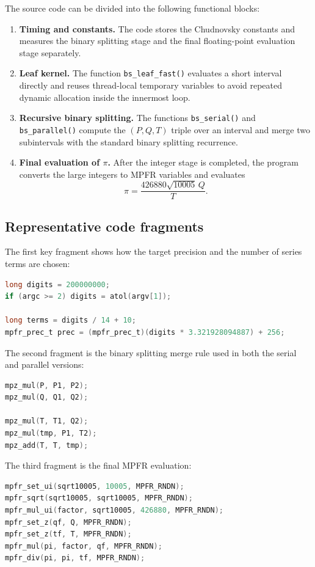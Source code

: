 \documentclass[12pt,a4paper]{article}
\begin{document}
The source code can be divided into the following functional blocks:
\begin{enumerate}[label=(\arabic*)]
    \item \textbf{Timing and constants.} The code stores the Chudnovsky constants and measures the binary splitting stage and the final floating-point evaluation stage separately.
    \item \textbf{Leaf kernel.} The function \texttt{bs\_leaf\_fast()} evaluates a short interval directly and reuses thread-local temporary variables to avoid repeated dynamic allocation inside the innermost loop.
    \item \textbf{Recursive binary splitting.} The functions \texttt{bs\_serial()} and \texttt{bs\_parallel()} compute the $(P,Q,T)$ triple over an interval and merge two subintervals with the standard binary splitting recurrence.
    \item \textbf{Final evaluation of $\pi$.} After the integer stage is completed, the program converts the large integers to MPFR variables and evaluates
    \[
        \pi = \frac{426880\sqrt{10005}\,Q}{T}.
    \]
\end{enumerate}

\subsection{Representative code fragments}

The first key fragment shows how the target precision and the number of series terms are chosen:

\begin{lstlisting}[language=C]
long digits = 200000000;
if (argc >= 2) digits = atol(argv[1]);

long terms = digits / 14 + 10;
mpfr_prec_t prec = (mpfr_prec_t)(digits * 3.321928094887) + 256;
\end{lstlisting}

The second fragment is the binary splitting merge rule used in both the serial and parallel versions:

\begin{lstlisting}[language=C]
mpz_mul(P, P1, P2);
mpz_mul(Q, Q1, Q2);

mpz_mul(T, T1, Q2);
mpz_mul(tmp, P1, T2);
mpz_add(T, T, tmp);
\end{lstlisting}

The third fragment is the final MPFR evaluation:

\begin{lstlisting}[language=C]
mpfr_set_ui(sqrt10005, 10005, MPFR_RNDN);
mpfr_sqrt(sqrt10005, sqrt10005, MPFR_RNDN);
mpfr_mul_ui(factor, sqrt10005, 426880, MPFR_RNDN);
mpfr_set_z(qf, Q, MPFR_RNDN);
mpfr_set_z(tf, T, MPFR_RNDN);
mpfr_mul(pi, factor, qf, MPFR_RNDN);
mpfr_div(pi, pi, tf, MPFR_RNDN);
\end{lstlisting}
\end{document}
